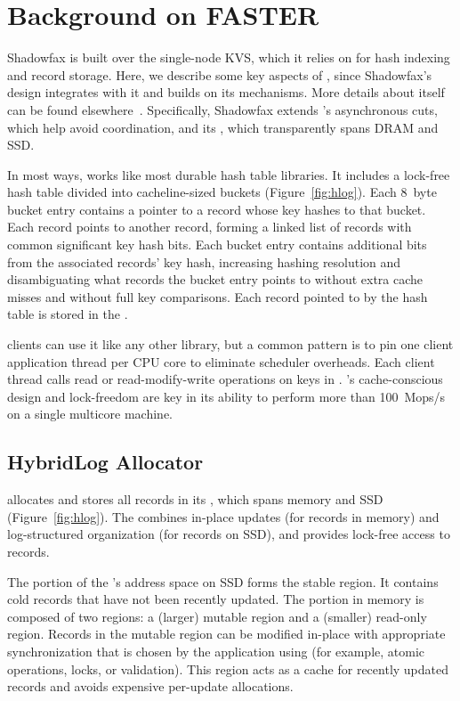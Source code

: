 \section{Background on FASTER}
\label{sec:fasterkv}

Shadowfax is built over the \faster single-node KVS, which it relies on for
hash indexing and record storage.
%
Here, we describe some key aspects of \faster, since Shadowfax's design
integrates with it and builds on its mechanisms.
%
More details about \faster itself can be found elsewhere~\cite{faster,cpr}.
%
Specifically, Shadowfax extends \faster's asynchronous
cuts, which help avoid coordination, and its \hlog, which transparently
spans DRAM and SSD.

In most ways, \faster works like most durable hash table libraries.
%
It includes a lock-free hash table divided into cacheline-sized buckets
(Figure~\ref{fig:hlog}).
%
Each 8~byte bucket entry contains a pointer to a record whose key hashes to
that bucket.
%
Each record points to another record, forming a linked list of records with
common significant key hash bits.
%
Each bucket entry contains additional bits from the associated records' key
hash, increasing hashing resolution and disambiguating what records the bucket
entry points to without extra cache misses and without full key comparisons.
%
Each record pointed to by the hash table is stored in the \hlog.

\faster clients can use it like any other library, but a common pattern is to
pin one client application thread per CPU core to eliminate scheduler overheads.
%
Each client thread calls read or read-modify-write operations on keys in
\faster.
%
\faster's cache-conscious design and lock-freedom are key in its ability to
perform more than 100~Mops/s on a single multicore machine.
%


\subsection{HybridLog Allocator}
\label{sec:hlog}

\faster allocates and stores all records in its \hlog, which spans memory and
SSD (Figure~\ref{fig:hlog}).
%
The \hlog combines in-place updates (for records in memory) and log-structured
organization (for records on SSD), and provides lock-free access to records.

The portion of the \hlog's address space on SSD forms the stable
region.
%
It contains cold records that have not been recently updated.
%
The portion in memory is composed of two regions: a (larger) mutable region and a
(smaller) read-only region.
%
Records in the mutable region can be modified in-place with appropriate
synchronization that is chosen by the application using \faster (for example, atomic
operations, locks, or validation).
%
This region acts as a cache for recently updated records and avoids expensive
per-update allocations.

